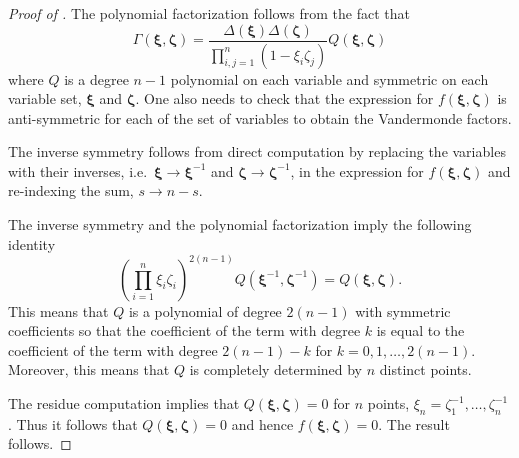 \documentclass[a4paper,11pt]{article}
\theoremstyle{definition}
\begin{document}
\begin{proof}[Proof of ]
The polynomial factorization follows from the fact that
\begin{equation}
    \Gamma(\boldsymbol{\xi}, \boldsymbol{\zeta}) = \frac{\Delta(\boldsymbol{\xi})\Delta(\boldsymbol{\zeta})}{\prod_{i, j=1}^n (1 - \xi_i \zeta_j)} Q(\boldsymbol{\xi}, \boldsymbol{\zeta})
\end{equation}
where $Q$ is a degree $n-1$ polynomial on each variable and symmetric on each variable set, $\boldsymbol{\xi}$ and $\boldsymbol{\zeta}$. One also needs to check that the expression for $f(\boldsymbol{\xi}, \boldsymbol{\zeta})$ is anti-symmetric for each of the set of variables to obtain the Vandermonde factors. 

The inverse symmetry follows from direct computation by replacing the variables with their inverses, i.e.~$\boldsymbol{\xi} \rightarrow \boldsymbol{\xi}^{-1}$ and $\boldsymbol{\zeta} \rightarrow \boldsymbol{\zeta}^{-1}$, in the expression for $f(\boldsymbol{\xi}, \boldsymbol{\zeta})$ and re-indexing the sum, $s \rightarrow n-s$. 

The inverse symmetry and the polynomial factorization imply the following identity
\begin{equation}
    \left( \prod_{i=1}^n \xi_i \zeta_i\right)^{2(n-1)} Q(\boldsymbol{\xi}^{-1}, \boldsymbol{\zeta}^{-1}) = Q(\boldsymbol{\xi}, \boldsymbol{\zeta}).
\end{equation}
This means that $Q$ is a polynomial of degree $2(n-1)$ with symmetric coefficients so that the coefficient of the term with degree $k$ is equal to the coefficient of the term with degree $2(n-1) - k$ for $k=0, 1, \dots, 2(n-1)$. Moreover, this means that $Q$ is completely determined by $n$ distinct points.  

The residue computation implies that $Q(\boldsymbol{\xi}, \boldsymbol{\zeta}) = 0$ for $n$ points, $\xi_n= \zeta_1^{-1}, \dots, \zeta_n^{-1}$. Thus it follows that $Q(\boldsymbol{\xi}, \boldsymbol{\zeta}) = 0$ and hence $f(\boldsymbol{\xi}, \boldsymbol{\zeta})=0$. The result follows. 
\end{proof}
\end{document}
